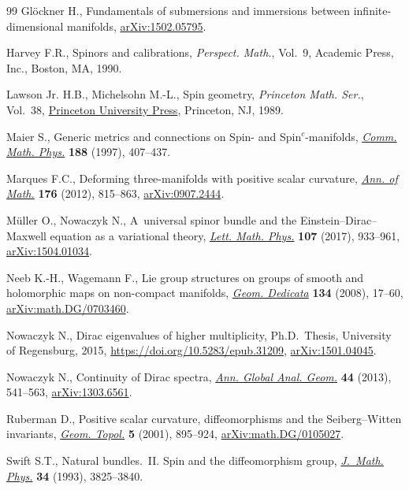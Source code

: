 \documentclass[11pt]{article}
\numberwithin{equation}{section}
\newcommand\<{\langle}
\renewcommand\>{\rangle}
\theoremstyle{definition}
\newcommand\={\,=\,}
\numberwithin{equation}{section}
\begin{document}
\begin{thebibliography}{99}
Gl\"ockner H., Fundamentals of submersions and immersions between
 infinite-dimensional manifolds,
 \href{http://arxiv.org/abs/1502.05795}{arXiv:1502.05795}.

Harvey F.R., Spinors and calibrations, \textit{Perspect. Math.}, Vol.~9,
 Academic Press, Inc., Boston, MA, 1990.

Lawson Jr. H.B., Michelsohn M.-L., Spin geometry, \textit{Princeton Math. Ser.},
 Vol.~38, \href{https://doi.org/10.1515/9781400883912}{Princeton University
 Press}, Princeton, NJ, 1989.

Maier S., Generic metrics and connections on {S}pin- and
 {S}pin{$^c$}-manifolds,
 \href{https://doi.org/10.1007/s002200050171}{\textit{Comm. Math. Phys.}}
 \textbf{188} (1997), 407--437.

Marques F.C., Deforming three-manifolds with positive scalar curvature,
 \href{https://doi.org/10.4007/annals.2012.176.2.3}{\textit{Ann. of Math.}}
 \textbf{176} (2012), 815--863,
 \href{http://arxiv.org/abs/0907.2444}{arXiv:0907.2444}.

M\"uller O., Nowaczyk N., A~universal spinor bundle and the
 {E}instein--{D}irac--{M}axwell equation as a variational theory,
 \href{https://doi.org/10.1007/s11005-016-0929-4}{\textit{Lett. Math. Phys.}}
 \textbf{107} (2017), 933--961,
 \href{http://arxiv.org/abs/1504.01034}{arXiv:1504.01034}.

Neeb K.-H., Wagemann F., Lie group structures on groups of smooth and
 holomorphic maps on non-compact manifolds,
 \href{https://doi.org/10.1007/s10711-008-9244-2}{\textit{Geom. Dedicata}}
 \textbf{134} (2008), 17--60,
 \href{http://arxiv.org/abs/math.DG/0703460}{arXiv:math.DG/0703460}.

Nowaczyk N., Dirac eigenvalues of higher multiplicity, Ph.D.~Thesis,
 {U}niversity of Regensburg, 2015, \url{https://doi.org/10.5283/epub.31209},
 \href{http://arxiv.org/abs/1501.04045}{arXiv:1501.04045}.

Nowaczyk N., Continuity of {D}irac spectra,
 \href{https://doi.org/10.1007/s10455-013-9381-1}{\textit{Ann. Global Anal.
 Geom.}} \textbf{44} (2013), 541--563,
 \href{http://arxiv.org/abs/1303.6561}{arXiv:1303.6561}.

Ruberman D., Positive scalar curvature, diffeomorphisms and the
 {S}eiberg--{W}itten invariants,
 \href{https://doi.org/10.2140/gt.2001.5.895}{\textit{Geom. Topol.}}
 \textbf{5} (2001), 895--924,
 \href{http://arxiv.org/abs/math.DG/0105027}{arXiv:math.DG/0105027}.

Swift S.T., Natural bundles.~{II}. {S}pin and the diffeomorphism group,
 \href{https://doi.org/10.1063/1.530009}{\textit{J.~Math. Phys.}} \textbf{34}
 (1993), 3825--3840.

\end{thebibliography}
\end{document}
